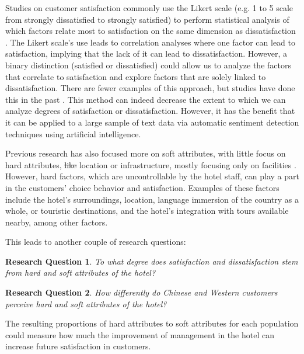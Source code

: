 \documentclass[smallextended,natbib]{svjour3}       %
\makeatletter
\newtheorem{rsq}{Research Question}
\newcounter{subrsq}
\newenvironment{subrsq}
         {%
          \setcounter{subrsq}{0}%
          \stepcounter{rsq}%
          \edef\saved@rsq{\thersq}%
          \let\c@rsq\c@subrsq     %
          \renewcommand{\thersq}{\saved@rsq\alph{rsq}}%
         }
         {}
\providecommand{\DIFadd}[1]{{\protect\color{blue}\uwave{#1}}} %
\providecommand{\DIFdel}[1]{{\protect\color{red}\sout{#1}}}                      %
\providecommand{\DIFaddbegin}{} %
\providecommand{\DIFaddend}{} %
\providecommand{\DIFdelbegin}{} %
\providecommand{\DIFdelend}{} %
\newcommand{\DIFscaledelfig}{0.5}
\newlength{\DIFdelgraphicswidth} %
\newlength{\DIFdelgraphicsheight} %
\newcommand{\DIFaddincludegraphics}[2][]{{\color{blue}\fbox{\DIFOincludegraphics[#1]{#2}}}} %
\newcommand{\DIFdelincludegraphics}[2][]{%
\sbox{\DIFdelgraphicsbox}{\DIFOincludegraphics[#1]{#2}}%
\settoboxwidth{\DIFdelgraphicswidth}{\DIFdelgraphicsbox} %
\settoboxtotalheight{\DIFdelgraphicsheight}{\DIFdelgraphicsbox} %
\scalebox{\DIFscaledelfig}{%
\parbox[b]{\DIFdelgraphicswidth}{\usebox{\DIFdelgraphicsbox}\\[-\baselineskip] \rule{\DIFdelgraphicswidth}{0em}}\llap{\resizebox{\DIFdelgraphicswidth}{\DIFdelgraphicsheight}{%
\setlength{\unitlength}{\DIFdelgraphicswidth}%
\begin{picture}(1,1)%
\thicklines\linethickness{2pt} %
{\color[rgb]{1,0,0}\put(0,0){\framebox(1,1){}}}%
{\color[rgb]{1,0,0}\put(0,0){\line( 1,1){1}}}%
{\color[rgb]{1,0,0}\put(0,1){\line(1,-1){1}}}%
\end{picture}%
}\hspace*{3pt}}} %
} %
\DeclareRobustCommand{\DIFaddbegin}{\DIFOaddbegin \let\includegraphics\DIFaddincludegraphics} %
\DeclareRobustCommand{\DIFaddend}{\DIFOaddend \let\includegraphics\DIFOincludegraphics} %
\DeclareRobustCommand{\DIFdelbegin}{\DIFOdelbegin \let\includegraphics\DIFdelincludegraphics} %
\DeclareRobustCommand{\DIFdelend}{\DIFOaddend \let\includegraphics\DIFOincludegraphics} %
\makeatother
\begin{document}
    Studies on customer satisfaction \cite[e.g.][]{truong2009, romao2014, wu2009} commonly use the Likert scale \cite[][]{likert1932technique} (e.g. 1 to 5 scale from strongly dissatisfied to strongly satisfied) to perform statistical analysis of which factors relate most to satisfaction on the same dimension as dissatisfaction \cite[e.g.][]{chan201518, choi2000}. The Likert scale's use leads to correlation analyses where one factor can lead to satisfaction, implying that the lack of it can lead to dissatisfaction. However, a binary distinction (satisfied or dissatisfied) could allow us to analyze the factors that correlate to satisfaction and explore factors that are solely linked to dissatisfaction. There are fewer examples of this approach, but studies have done this in the past \cite[e.g.][]{zhou2014}. This method can indeed decrease the extent to which we can analyze degrees of satisfaction or dissatisfaction. However, it has the benefit that it can be applied to a large sample of text data via automatic sentiment detection techniques using artificial intelligence. 

    Previous research has also focused more on soft attributes, with little focus on hard attributes, \DIFdelbegin \DIFdel{like }\DIFdelend \DIFaddbegin \DIFadd{such as }\DIFaddend location or infrastructure, mostly focusing only on facilities \cite[e.g.][]{shanka2004, choi2001}. However, hard factors, which are uncontrollable by the hotel staff, can play a part in the customers' choice behavior and satisfaction. Examples of these factors include the hotel's surroundings, location, language immersion of the country as a whole, or touristic destinations, and the hotel's integration with tours available nearby, among other factors. 

    This leads to another couple of research questions:

    \begin{subrsq}
    \begin{rsq}
    \label{rsq:hard_soft}
    To what degree does satisfaction and dissatisfaction stem from hard and soft attributes of the hotel?
    \end{rsq}

    \begin{rsq}
    \label{rsq:hard_soft_diff}
    How differently do Chinese and Western customers perceive hard and soft attributes of the hotel?
    \end{rsq}
    \end{subrsq}

    The resulting proportions of hard attributes to soft attributes for each population could measure how much the improvement of management in the hotel can increase future satisfaction in customers. 
\end{document}
